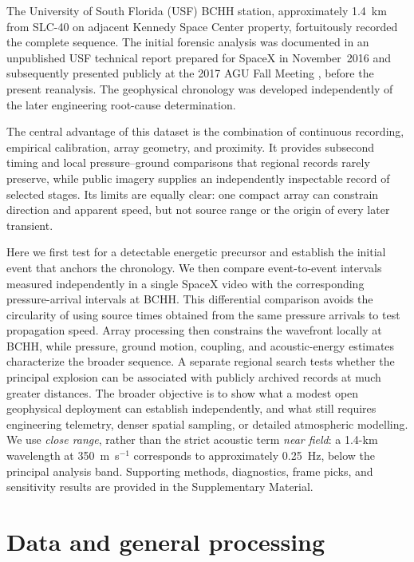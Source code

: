 \documentclass[]{seismica}
\begin{document}
The University of South Florida (USF) BCHH station, approximately 1.4~km from
SLC-40 on adjacent Kennedy Space Center property, fortuitously recorded the
complete sequence. The initial forensic analysis was documented in an
unpublished USF technical report prepared for SpaceX in November~2016
\citep{thompson_mcnutt_fireball_2016} and subsequently presented publicly at
the 2017 AGU Fall Meeting \citep{thompson_agu_falcon9_2017}, before the
present reanalysis. The geophysical chronology was developed independently of
the later engineering root-cause determination.

The central advantage of this dataset is the combination of continuous
recording, empirical calibration, array geometry, and proximity. It provides
subsecond timing and local pressure--ground comparisons that regional records
rarely preserve, while public imagery supplies an independently inspectable
record of selected stages. Its limits are equally clear: one compact array can
constrain direction and apparent speed, but not source range or the origin of
every later transient.

Here we first test for a detectable energetic precursor and establish the
initial event that anchors the chronology. We then compare event-to-event
intervals measured independently in a single SpaceX video with the corresponding
pressure-arrival intervals at BCHH. This differential comparison avoids the
circularity of using source times obtained from the same pressure arrivals to
test propagation speed. Array processing then constrains the wavefront locally
at BCHH, while pressure, ground motion, coupling, and acoustic-energy estimates
characterize the broader sequence. A separate regional search tests whether the
principal explosion can be associated with publicly archived records at much
greater distances. The broader objective is to show what a modest open
geophysical deployment can establish independently, and what still requires
engineering telemetry, denser spatial sampling, or detailed atmospheric
modelling. We use \emph{close range}, rather than the strict acoustic term
\emph{near field}: a 1.4-km wavelength at 350~m~s$^{-1}$ corresponds to
approximately 0.25~Hz, below the principal analysis band. Supporting methods,
diagnostics, frame picks, and sensitivity results are provided in the
Supplementary Material.


\section{Data and general processing}
\label{sec:data}
\end{document}

